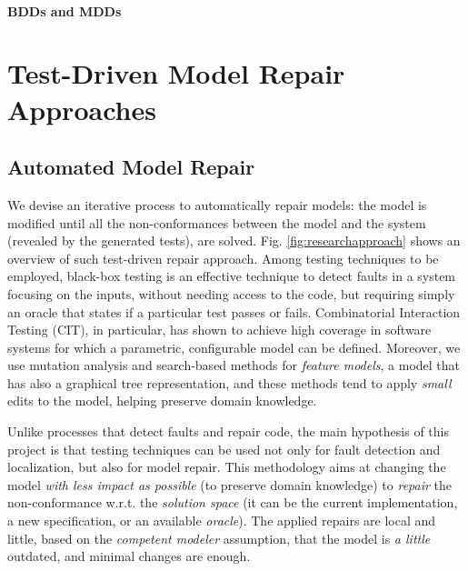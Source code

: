 \documentclass [a4paper, 12pt, twoside]{report}
\theoremstyle{plain}
\theoremstyle{definition}
\theoremstyle{remark}
\theoremstyle{plain}
\theoremstyle{plain}
\theoremstyle{remark}
\begin{document}

\subsection{BDDs and MDDs}




\part{Test-Driven Model Repair Approaches}
\chapter{Automated Model Repair}\label{ch:automatedrepair}
We devise an iterative process to automatically repair models: the model is modified until all the non-conformances between the model and the system (revealed by the generated tests), are solved. Fig. \ref{fig:researchapproach} shows an overview of such test-driven repair approach. 
Among testing techniques to be employed, black-box testing is an effective technique to detect faults in a system focusing on the inputs, without needing access to the code, but requiring simply an oracle that states if a particular test passes or fails. 
Combinatorial Interaction Testing (CIT), in particular, has shown to achieve high coverage in software systems for which a parametric, configurable model can be defined. Moreover, we use mutation analysis and search-based methods for \textit{feature models}, a model that has also a graphical tree representation, and these methods tend to apply \textit{small} edits to the model, helping preserve domain knowledge.

Unlike processes that detect faults and repair code, the main hypothesis of this project is that testing techniques can be used not only for fault detection and localization, but also for model repair.
This methodology aims at changing the model \textit{with less impact as possible} (to preserve domain knowledge) to \textit{repair} the non-conformance w.r.t. the \textit{solution space} (it can be the current implementation, a new specification, or an available \textit{oracle}).
The applied repairs are local and little, based on the \textit{competent modeler} assumption, that the model is \textit{a little} outdated, and minimal changes are enough. 
\end{document}
